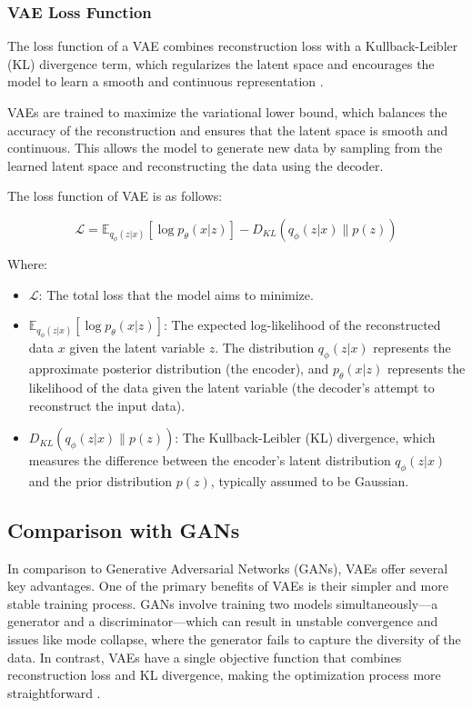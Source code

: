 \subsubsection{VAE Loss Function}
The loss function of a VAE combines reconstruction loss with a Kullback-Leibler (KL) divergence term, which regularizes the latent space and encourages the model to learn a smooth and continuous representation \citep{10.3390/jimaging4020036}.

VAEs are trained to maximize the variational lower bound, which balances the accuracy of the reconstruction and ensures that the latent space is smooth and continuous. This allows the model to generate new data by sampling from the learned latent space and reconstructing the data using the decoder.

The loss function of VAE is as follows:

\begin{equation}
\mathcal{L} = \mathbb{E}_{q_\phi(z|x)}[\log p_\theta(x|z)] - D_{KL}(q_\phi(z|x) \| p(z))
\end{equation}

Where:
\begin{itemize}
    \item \(\mathcal{L}\): The total loss that the model aims to minimize.
    \item \(\mathbb{E}_{q_\phi(z|x)}[\log p_\theta(x|z)]\): The expected log-likelihood of the reconstructed data \(x\) given the latent variable \(z\). The distribution \(q_\phi(z|x)\) represents the approximate posterior distribution (the encoder), and \(p_\theta(x|z)\) represents the likelihood of the data given the latent variable (the decoder's attempt to reconstruct the input data).
    \item \(D_{KL}(q_\phi(z|x) \| p(z))\): The Kullback-Leibler (KL) divergence, which measures the difference between the encoder's latent distribution \(q_\phi(z|x)\) and the prior distribution \(p(z)\), typically assumed to be Gaussian.
\end{itemize}

\subsection{Comparison with GANs}

In comparison to Generative Adversarial Networks (GANs), VAEs offer several key advantages. One of the primary benefits of VAEs is their simpler and more stable training process. GANs involve training two models simultaneously—a generator and a discriminator—which can result in unstable convergence and issues like mode collapse, where the generator fails to capture the diversity of the data. In contrast, VAEs have a single objective function that combines reconstruction loss and KL divergence, making the optimization process more straightforward \citep{10.1561/2200000056}.

